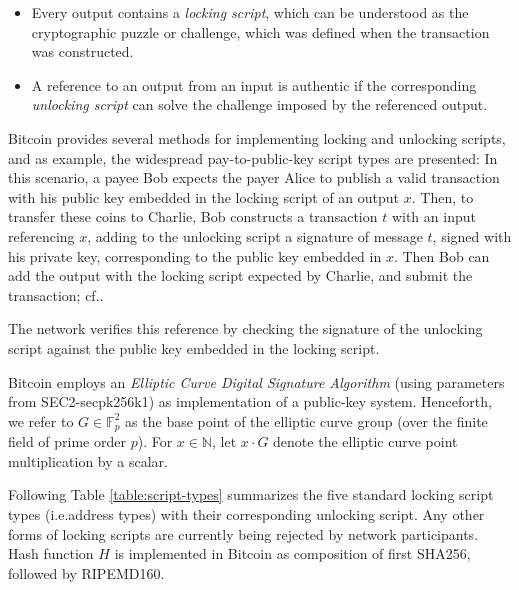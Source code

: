 \documentclass[a4paper,11pt,titlepage]{scrbook}
\begin{document}
\begin{itemize}
    \item Every output contains a \emph{locking script}, which can be understood as the cryptographic puzzle or challenge, which was defined when the transaction was constructed.
    \item A reference to an output from an input is authentic if the corresponding \emph{unlocking script} can solve the challenge imposed by the referenced output.
\end{itemize}

Bitcoin provides several methods for implementing locking and unlocking scripts, and as example, the widespread pay-to-public-key script types are presented: In this scenario, a payee Bob expects the payer Alice to publish a valid transaction with his public key embedded in the locking script of an output $x$.
Then, to transfer these coins to Charlie, Bob constructs a transaction $t$ with an input referencing $x$, adding to the unlocking script a signature of message $t$, signed with his private key, corresponding to the public key embedded in $x$.
Then Bob can add the output with the locking script expected by Charlie, and submit the transaction; cf.\@ \cite[Chap.~6--7]{antonopoulos_mastering_2017}.


The network verifies this reference by checking the signature of the unlocking script against the public key embedded in the locking script.


Bitcoin employs an \emph{Elliptic Curve Digital Signature Algorithm} (using parameters from SEC2-secpk256k1) as implementation of a public-key system.
Henceforth, we refer to $G\in \mathbb{F}_p^2$ as the base point of the elliptic curve group (over the finite field of prime order $p$). For $x\in \mathbb{N}$, let $x\cdot G$ denote the elliptic curve point multiplication by a scalar.

Following Table \ref{table:script-types} summarizes the five standard locking script types (i.e.\@ address types) with their corresponding unlocking script. Any other forms of locking scripts are currently being rejected by network participants.
Hash function $H$ is implemented in Bitcoin as composition of first SHA256, followed by RIPEMD160.
\end{document}
